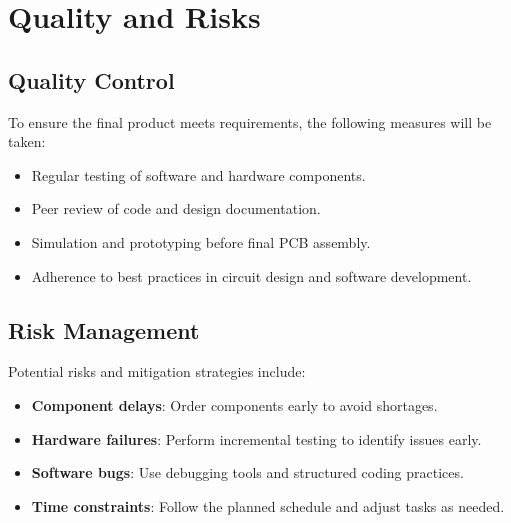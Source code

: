 \section{Quality and Risks}
\subsection{Quality Control}
To ensure the final product meets requirements, the following measures will be taken:
\begin{itemize}
    \item Regular testing of software and hardware components.
    \item Peer review of code and design documentation.
    \item Simulation and prototyping before final PCB assembly.
    \item Adherence to best practices in circuit design and software development.
\end{itemize}

\subsection{Risk Management}
Potential risks and mitigation strategies include:
\begin{itemize}
    \item \textbf{Component delays}: Order components early to avoid shortages.
    \item \textbf{Hardware failures}: Perform incremental testing to identify issues early.
    \item \textbf{Software bugs}: Use debugging tools and structured coding practices.
    \item \textbf{Time constraints}: Follow the planned schedule and adjust tasks as needed.
\end{itemize}